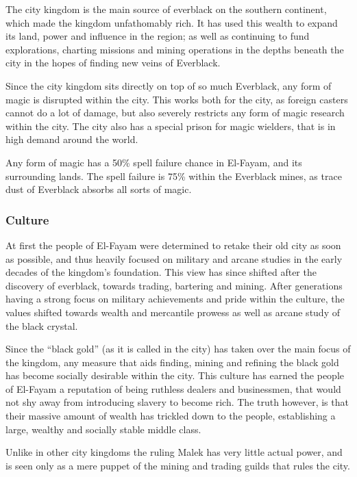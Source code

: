 The city kingdom is the main source of everblack on the southern continent,
which made the kingdom unfathomably rich. It has used this wealth to expand
its land, power and influence in the region; as well as continuing to fund
explorations, charting missions and mining operations in the depths beneath
the city in the hopes of finding new veins of Everblack.

Since the city kingdom sits directly on top of so much Everblack, any form
of magic is disrupted within the city. This works both for the city, as
foreign casters cannot do a lot of damage, but also severely restricts any
form of magic research within the city. The city also has a special prison
for magic wielders, that is in high demand around the world.

\begin{note}
  Any form of magic has a 50\% spell failure chance in El-Fayam, and its
  surrounding lands. The spell failure is 75\% within the Everblack mines,
  as trace dust of Everblack absorbs all sorts of magic.
\end{note}

\subsubsection{Culture}

At first the people of El-Fayam were determined to retake their old city as
soon as possible, and thus heavily focused on military and arcane studies in
the early decades of the kingdom's foundation. This view has since shifted after
the discovery of everblack, towards trading, bartering and mining. After
generations having a strong focus on military achievements and pride within
the culture, the values shifted towards wealth and mercantile prowess as well
as arcane study of the black crystal.

Since the ``black gold'' (as it is called in the city) has taken over the main
focus of the kingdom, any measure that aids finding, mining and refining the
black gold has become socially desirable within the city. This culture has
earned the people of El-Fayam a reputation of being ruthless dealers and
businessmen, that would not shy away from introducing slavery to become rich.
The truth however, is that their massive amount of wealth has trickled down
to the people, establishing a large, wealthy and socially stable middle class.

Unlike in other city kingdoms the ruling Malek has very little actual power,
and is seen only as a mere puppet of the mining and trading guilds that
rules the city.

